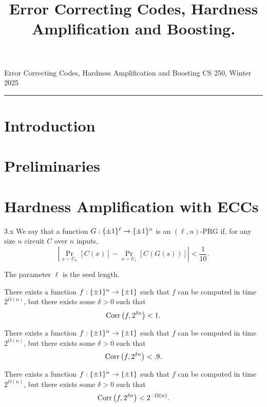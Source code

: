\documentclass[11pt]{article}
\title{Error Correcting Codes, Hardness Amplification and Boosting.}
\date{}
\begin{document}
    
\noindent Error Correcting Codes, Hardness Amplification and Boosting \hfill  CS 250, Winter 2025\\
\hrule

\section{Introduction}

\section{Preliminaries}

\section{Hardness Amplification with ECCs}

\begin{definition}{3.x}
    We say that a function $G : \{\pm 1\}^\ell \rightarrow \{\pm 1\}^{n}$ is an $(\ell, n)$-PRG if, for any size $n$ circuit $C$ over $n$ inputs, 
    \begin{equation*}
        \left|\Pr_{x \backsim U_n}[C(x)] - \Pr_{x \backsim U_s}[C(G(s))]\right| < \frac{1}{10}.
    \end{equation*}
\end{definition}

The parameter $\ell$ is the seed length.

\begin{assumption}{1} \label{a-1}
    There exists a function $f : \{\pm 1\}^n \rightarrow \{\pm 1\}$ such that $f$ can be computed in time $2^{O(n)}$, but there exists some $\delta > 0$ such that 
    \begin{equation*}
        \mathrm{Corr}\left(f, 2^{\delta n}\right) < 1.
    \end{equation*}
\end{assumption}

\begin{assumption}{2} \label{a-2}
    There exists a function $f : \{\pm 1\}^n \rightarrow \{\pm 1\}$ such that $f$ can be computed in time $2^{O(n)}$, but there exists some $\delta > 0$ such that 
    \begin{equation*}
        \mathrm{Corr}\left(f, 2^{\delta n}\right) < .9.
    \end{equation*}
\end{assumption}

\begin{assumption}{3} \label{a-3}
    There exists a function $f : \{\pm 1\}^n \rightarrow \{\pm 1\}$ such that $f$ can be computed in time $2^{O(n)}$, but there exists some $\delta > 0$ such that 
    \begin{equation*}
        \mathrm{Corr}\left(f, 2^{\delta n}\right) < 2^{-\Omega(n)}.
    \end{equation*}
\end{assumption}
\end{document}
